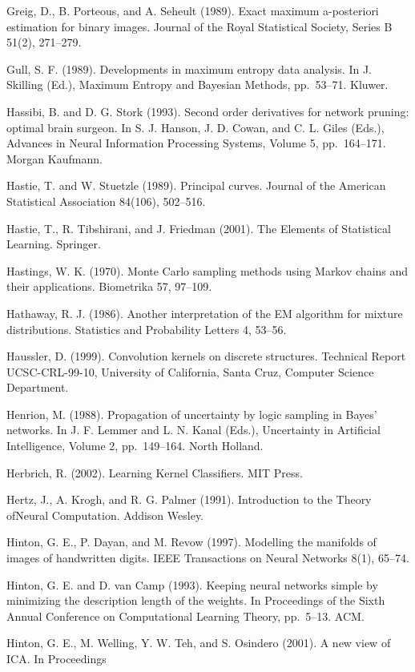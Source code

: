 \documentclass[
  10
]{article}
\begin{document}
Greig, D., B. Porteous, and A. Seheult (1989). Exact maximum
a-posteriori estimation for binary images. Journal of the Royal
Statistical Society, Series B 51(2), 271--279.

Gull, S. F. (1989). Developments in maximum entropy data analysis. In J.
Skilling (Ed.), Maximum Entropy and Bayesian Methods, pp.~53--71.
Kluwer.

Hassibi, B. and D. G. Stork (1993). Second order derivatives for network
pruning: optimal brain surgeon. In S. J. Hanson, J. D. Cowan, and C. L.
Giles (Eds.), Advances in Neural Information Processing Systems, Volume
5, pp.~164--171. Morgan Kaufmann.

Hastie, T. and W. Stuetzle (1989). Principal curves. Journal of the
American Statistical Association 84(106), 502--516.

Hastie, T., R. Tibshirani, and J. Friedman (2001). The Elements of
Statistical Learning. Springer.

Hastings, W. K. (1970). Monte Carlo sampling methods using Markov chains
and their applications. Biometrika 57, 97--109.

Hathaway, R. J. (1986). Another interpretation of the EM algorithm for
mixture distributions. Statistics and Probability Letters 4, 53--56.

Haussler, D. (1999). Convolution kernels on discrete structures.
Technical Report UCSC-CRL-99-10, University of California, Santa Cruz,
Computer Science Department.

Henrion, M. (1988). Propagation of uncertainty by logic sampling in
Bayes' networks. In J. F. Lemmer and L. N. Kanal (Eds.), Uncertainty in
Artificial Intelligence, Volume 2, pp.~149--164. North Holland.

Herbrich, R. (2002). Learning Kernel Classifiers. MIT Press.

Hertz, J., A. Krogh, and R. G. Palmer (1991). Introduction to the Theory
ofNeural Computation. Addison Wesley.

Hinton, G. E., P. Dayan, and M. Revow (1997). Modelling the manifolds of
images of handwritten digits. IEEE Transactions on Neural Networks 8(1),
65--74.

Hinton, G. E. and D. van Camp (1993). Keeping neural networks simple by
minimizing the description length of the weights. In Proceedings of the
Sixth Annual Conference on Computational Learning Theory, pp.~5--13.
ACM.

Hinton, G. E., M. Welling, Y. W. Teh, and S. Osindero (2001). A new view
of ICA. In Proceedings
\end{document}

